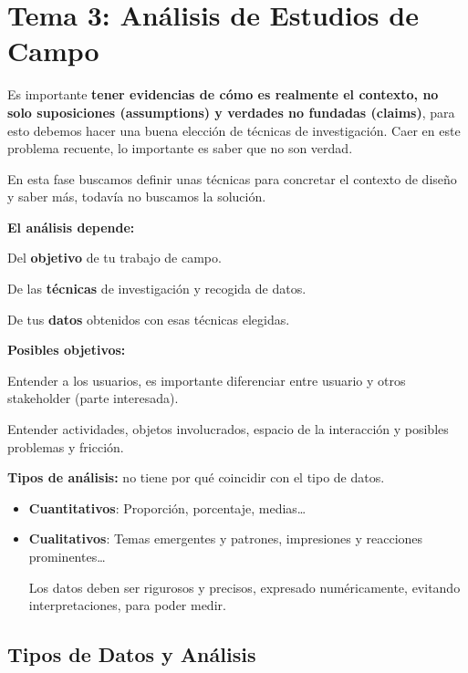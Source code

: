 \documentclass[12pt]{report} %
\begin{document}
\chapter{Tema 3: Análisis de Estudios de
Campo}

Es importante \textbf{tener evidencias de cómo es realmente el contexto,
no solo suposiciones (assumptions) y verdades no fundadas (claims)},
para esto debemos hacer una buena elección de técnicas de investigación.
Caer en este problema recuente, lo importante es saber que no son
verdad.

En esta fase buscamos definir unas técnicas para concretar el contexto
de diseño y saber más, todavía no buscamos la solución.

\textbf{El análisis depende:}

Del \textbf{objetivo} de tu trabajo de campo.

De las \textbf{técnicas} de investigación y recogida de datos.

De tus \textbf{datos} obtenidos con esas técnicas elegidas.

\textbf{Posibles objetivos:}

Entender a los usuarios, es importante diferenciar entre usuario y otros
stakeholder (parte interesada).

Entender actividades, objetos involucrados, espacio de la interacción y
posibles problemas y fricción.

\textbf{Tipos de análisis:} no tiene por qué coincidir con el tipo de
datos.

\begin{itemize}
\item
  \textbf{Cuantitativos}: Proporción, porcentaje, medias\ldots{}
\item
  \textbf{Cualitativos}: Temas emergentes y patrones, impresiones y
  reacciones prominentes\ldots{}

  Los datos deben ser rigurosos y precisos, expresado numéricamente,
  evitando interpretaciones, para poder medir.
\end{itemize}

\section{Tipos de Datos y
Análisis}
\end{document}

